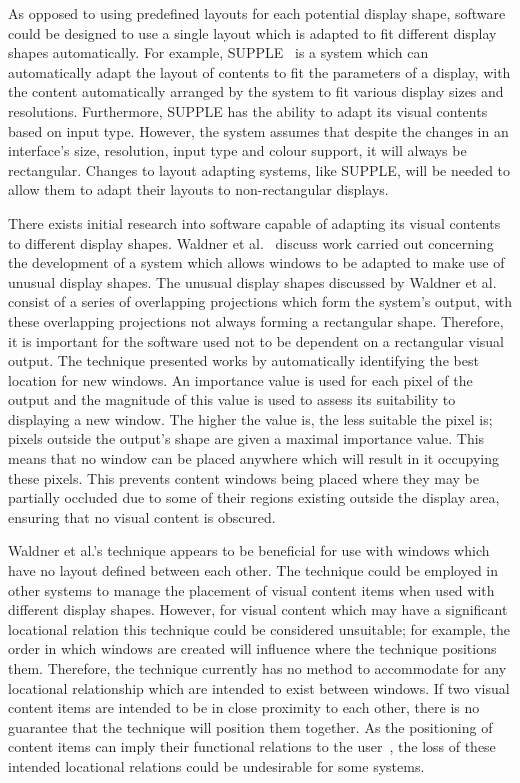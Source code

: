 \documentclass[twocolumn,compsoc]{cvm}
\begin{document}
As opposed to using predefined layouts for each potential display shape, software could be designed to use a single layout which is adapted to fit different display shapes automatically.
For example, SUPPLE~\cite{Gajos2004} is a system which can
automatically adapt the layout of contents to fit the parameters of a display, with the content automatically arranged by the system to fit various display sizes and resolutions.
Furthermore, SUPPLE has the ability to adapt its visual contents based on input type.
However, the system assumes that despite the changes in an interface's size, resolution, input type and colour support, it will always be rectangular.
Changes to layout adapting systems, like SUPPLE, will be needed to allow them to adapt their layouts to non-rectangular displays.

There exists initial research into software capable of adapting its visual contents to different display shapes.
Waldner et al.~\cite{Waldner2011} discuss work carried out concerning the development of a system which allows windows to be adapted to make use of unusual display shapes.
The unusual display shapes discussed by Waldner et al. consist of a series of overlapping projections which form the system's output, with these overlapping projections not always forming a rectangular shape.
Therefore, it is important for the software used not to be dependent on a rectangular visual output.
The technique presented works by automatically identifying the best location for new windows.
An importance value is used for each pixel of the output and the magnitude of this value is used to assess its suitability to displaying a new window.
The higher the value is, the less suitable the pixel is; pixels outside the output's shape are given a maximal importance value.
This means that no window can be placed anywhere which will result in it occupying these pixels.
This prevents content windows being placed where they may be partially occluded due to some of their regions existing outside the display area, ensuring that no visual content is obscured.

Waldner et al.'s technique appears to be beneficial for use with windows which have no layout defined between each other.
The technique could be employed in other systems to manage the placement of visual content items when used with different display shapes.
However, for visual content which may have a significant locational relation this technique could be considered unsuitable; for example, the order in which windows are created will influence where the technique positions them.
Therefore, the technique currently has no method to accommodate for any locational relationship which are intended to exist between windows.
If two visual content items are intended to be in close proximity to each other, there is no guarantee that the technique will position them together.
As the positioning of content items can imply their functional relations to the user~\cite{Constantine1999}, the loss of these intended locational relations could be undesirable for some systems.
\end{document}
